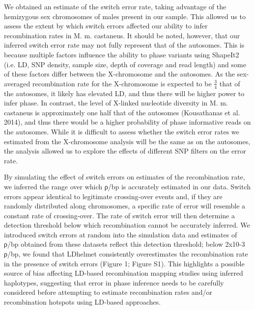         	We obtained an estimate of the switch error rate, taking advantage of the hemizygous sex chromosomes of males present in our sample. This allowed us to assess the extent by which switch errors affected our ability to infer recombination rates in M. m. castaneus. It should be noted, however, that our inferred switch error rate may not fully represent that of the autosomes. This is because multiple factors influence the ability to phase variants using ShapeIt2 (i.e. LD, SNP density, sample size, depth of coverage and read length) and some of these factors differ between the X-chromosome and the autosomes. As the sex-averaged recombination rate for the X-chromosome is expected to be \( \frac{3}{4} \) that of the autosomes, it likely has elevated LD, and thus there will be higher power to infer phase. In contrast, the level of X-linked nucleotide diversity in M. m. castaneus is approximately one half that of the autosomes (Kousathanas et al. 2014), and thus there would be a higher probability of phase informative reads on the autosomes. While it is difficult to assess whether the switch error rates we estimated from the X-chromosome analysis will be the same as on the autosomes, the analysis allowed us to explore the effects of different SNP filters on the error rate.

By simulating the effect of switch errors on estimates of the recombination rate, we inferred the range over which ρ/bp is accurately estimated in our data. Switch errors appear identical to legitimate crossing-over events and, if they are randomly distributed along chromosomes, a specific rate of error will resemble a constant rate of crossing-over. The rate of switch error will then determine a detection threshold below which recombination cannot be accurately inferred. We introduced switch errors at random into the simulation data and estimates of ρ/bp obtained from these datasets reflect this detection threshold; below 2x10-3 ρ/bp, we found that LDhelmet consistently overestimates the recombination rate in the presence of switch errors (Figure 1; Figure S1). This highlights a possible source of bias affecting LD-based recombination mapping studies using inferred haplotypes, suggesting that error in phase inference needs to be carefully considered before attempting to estimate recombination rates and/or recombination hotspots using LD-based approaches.
 
